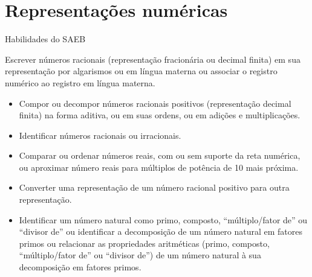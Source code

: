 \section{Representações numéricas}

Habilidades do SAEB 

Escrever números racionais (representação
fracionária ou decimal finita) em sua representação por algarismos ou em
língua materna ou associar o registro numérico ao registro em língua
materna.

\begin{itemize}
\item
  Compor ou decompor números racionais positivos (representação decimal
  finita) na forma aditiva, ou em suas ordens, ou em adições e
  multiplicações.
\item
  Identificar números racionais ou irracionais.
\item
  Comparar ou ordenar números reais, com ou sem suporte da reta
  numérica, ou aproximar número reais para múltiplos de potência de 10
  mais próxima.
\item
  Converter uma representação de um número racional positivo para outra
  representação.
\item
  Identificar um número natural como primo, composto, ``múltiplo/fator
  de'' ou ``divisor de'' ou identificar a decomposição de um número
  natural em fatores primos ou relacionar as propriedades aritméticas
  (primo, composto, ``múltiplo/fator de'' ou ``divisor de'') de um
  número natural à sua decomposição em fatores primos.
\end{itemize}


